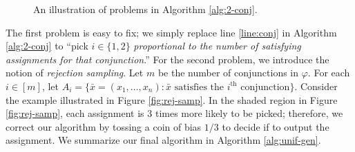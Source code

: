 \documentclass[letterpaper, reqno,11pt]{article}
\begin{document}
\begin{figure}[h]
  \centering
  \caption{An illustration of problems in Algorithm \ref{alg:2-conj}.}
  \label{fig:2-conj}
\end{figure}

The first problem is easy to fix; we simply replace line \ref{line:conj} in Algorithm \ref{alg:2-conj} to ``pick $i \in \{ 1, 2 \}$ \emph{proportional to the number of satisfying assignments for that conjunction}.'' For the second problem, we introduce the notion of \emph{rejection sampling}. Let $m$ be the number of conjunctions in $\varphi$. For each $i \in [m]$, let $A_i = \{ \bar x = (x_1, \ldots, x_n) : \text{$\bar x$ satisfies the $i^\text{th}$ conjunction} \}$. Consider the example illustrated in Figure \ref{fig:rej-samp}. In the shaded region in Figure \ref{fig:rej-samp}, each assignment is $3$ times more likely to be picked; therefore, we correct our algorithm by tossing a coin of bias $1/3$ to decide if to output the assignment. We summarize our final algorithm in Algorithm \ref{alg:unif-gen}.
\end{document}
